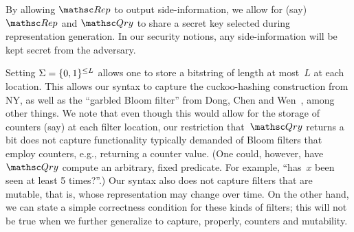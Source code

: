 By allowing $\Rep$ to output side-information, we allow for (say) $\Rep$ and $\Qry$ to share a secret key selected during representation generation.    In our security notions, any side-information will be kept secret from the adversary.

Setting $\Sigma=\{0,1\}^{\leq L}$ allows one to store a bitstring of length at most~$L$ at each location.  This allows our syntax to capture the cuckoo-hashing construction from NY, as well as the ``garbled Bloom filter'' from Dong, Chen and Wen~\cite{xxx}, among other things. We note that even though this would allow for the storage of counters (say) at each filter location, our restriction that~$\Qry$ returns a bit does not capture functionality typically demanded of Bloom filters that employ counters, e.g., returning a counter value. (One could, however, have $\Qry$ compute an arbitrary, fixed predicate.  For example, ``has~$x$ been seen at least 5 times?''.)
Our syntax also does not capture filters that are mutable, that is, whose representation may change over time.
On the other hand, we can state a simple correctness condition for these kinds of filters; this will not be true when we further generalize to capture, properly, counters and mutability.

